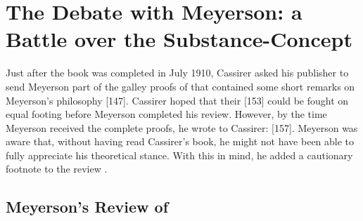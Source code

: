 \documentclass[submitted,12pt]{article}
\begin{document}
 
\section{The Debate with Meyerson: a Battle over the Substance-Concept}
\label{sec:meyerson}
%
Just after the book was completed in July 1910, Cassirer asked his publisher to send Meyerson part of the galley proofs of \SFt that contained some short remarks on Meyerson's philosophy  [147]. Cassirer hoped that their  [153] could be fought on equal footing before Meyerson completed his review. However, by the time Meyerson received the complete proofs, he wrote to Cassirer:  [157]. Meyerson was aware that, without having read Cassirer’s book, he might not have been able to fully appreciate his theoretical stance. With this in mind, he added a cautionary footnote to the review \citep[123]{Meyerson1911}.





\subsection{Meyerson's Review of \EPt}
\end{document}
